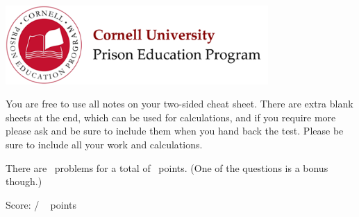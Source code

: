\documentclass[addpoints,12pt]{exam}
\begin{document}

\begin{flushright}
\vspace{0.2in}

\end{flushright}

\begin{center}
\includegraphics[width=10cm]{../images/logo.png}
\end{center}

\begin{center}
\end{center}

\vspace{0.5in}

\begin{large}
You are free to use all notes on your two-sided cheat sheet. There are extra blank sheets at the end, which can be used for calculations, and if you require more please ask and be sure to include them when you hand back the test. Please be sure to include all your work and calculations.

There are \numquestions~problems for a total of \numpoints~points. (One of the questions is a bonus though.)
\end{large}
\vspace{0.2in}


 
\clearpage

\begin{flushright}
Score: \hspace{0.2in} / \numpoints ~ points
\end{flushright}
\end{document}
